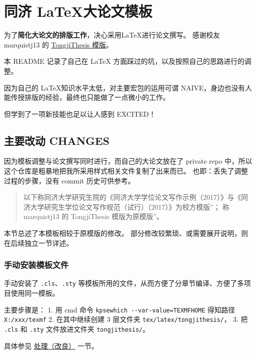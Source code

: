 \documentclass[../Main/thesis.tex]{subfiles}
\begin{document}
\chapter{同济 \LaTeX 大论文模板}

为了\textbf{简化大论文的排版工作}，决心采用LaTeX进行论文撰写。 感谢校友
marquistj13 的
\href{https://github.com/marquistj13/TongjiThesis}{TongjiThesis 模版}。

本 README 记录了自己在 \LaTeX{} 方面踩过的坑，以及按照自己的思路进行的调整。

因为自己的 \LaTeX 知识水平太低，对主要宏包的运用可谓
NAIVE，身边也没有人能传授排版的经验，最终也只能做了一点微小的工作。

但学到了一项新技能也足以让人感到 EXCITED！

\section{主要改动 CHANGES}
\label{ux4e3bux8981ux6539ux52a8-changes}

因为模板调整与论文撰写同时进行，而自己的大论文放在了 private repo
中，所以这个仓库是粗暴地把我所采用样式相关文件复制了出来而已。
也即：丢失了调整过程的步骤，没有 commit 历史可供参考。

\begin{quote}
以下称同济大学研究生院的《同济大学学位论文写作示例（2017）》与《同济大学研究生学位论文写作规范（试行）（2017）》为校方模版''；
称 marquistj13 的 TongjiThesis 模版为原模版''。
\end{quote}

本节总述了本模板相较于原模版的修改。
部分修改较繁琐、或需要展开说明，则在后续独立一节详述。

\subsection{手动安装模板文件}

手动安装了 \texttt{.cls}、\texttt{.sty}
等模板所用的文件，从而方便了分章节编译、方便了多项目使用同一模板。

主要步骤是： 1. 用 cmd 命令 \texttt{kpsewhich\ -\/-var-value=TEXMFHOME}
得知路径 \texttt{X:/xxx/texmf} 2. 在其中继续创建 3 层文件夹
\texttt{tex/latex/tongjithesis/}， 3. 把 \texttt{.cls} 和 \texttt{.sty}
文件放进文件夹 \texttt{tongjithesis/}。

具体参见
\protect\hyperlink{ux5cux25e5ux5cux25a4ux5cux2584ux5cux25e7ux5cux2590ux5cux2586ux5cux25e6ux5cux2594ux5cux25b9ux5cux25e8ux5cux2589ux5cux25af}{处理（改良）}
一节。
\end{document}
